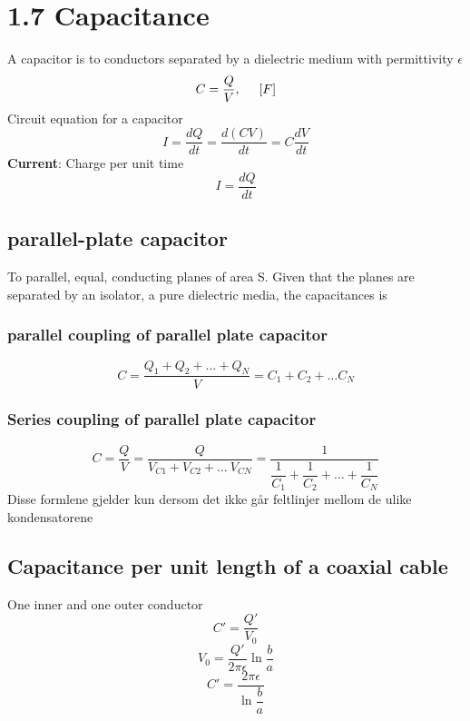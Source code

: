 \documentclass[
12pt, reprint, aip, onecolumn, notitlepage
]{revtex4-1}
\begin{document}
\section{1.7 Capacitance}
A capacitor is to conductors separated by a dielectric medium with permittivity $\epsilon$
\begin{equation}
	C = \dfrac{Q}{V}, \hspace{5mm} [F]
\end{equation}
Circuit equation for a capacitor
\begin{equation}
	I = \dfrac{dQ}{dt} = \dfrac{d(CV)}{dt} = C\dfrac{dV}{dt}
\end{equation}
\textbf{Current}: Charge per unit time
\begin{equation}
	I = \dfrac{dQ}{dt}
\end{equation}
\subsection{parallel-plate capacitor}
To parallel, equal, conducting planes of area S.
Given that the planes are separated by an isolator, a pure dielectric media, the capacitances is 
\subsubsection*{parallel coupling of parallel plate capacitor}
\begin{equation}
	C = \dfrac{Q_1 +Q_2 + \dots + Q_N}{V} = C_1 + C_2 +\dots C_N
\end{equation}
\subsubsection*{Series coupling of parallel plate capacitor}
\begin{equation}
	C = \dfrac{Q}{V} = \dfrac{Q}{V_{C1} + V_{C2} + \dots \ V_{CN}} = \dfrac{1}{\dfrac{1}{C_1}+\dfrac{1}{C_2}+\dots + \dfrac{1}{C_N}}
\end{equation}
Disse formlene gjelder kun dersom det ikke går feltlinjer mellom de ulike kondensatorene
\subsection{Capacitance per unit length of a coaxial cable}
One inner and one outer conductor
\begin{equation}
	C' = \dfrac{Q'}{V_0} \end{equation}
	\begin{equation}
	V_0 = \dfrac{Q'}{2\pi\epsilon}\ln{\dfrac{b}{a}}\end{equation}
\begin{equation}
	C' = \dfrac{2\pi\epsilon}{\ln{\dfrac{b}{a}}}
\end{equation}
\end{document}
